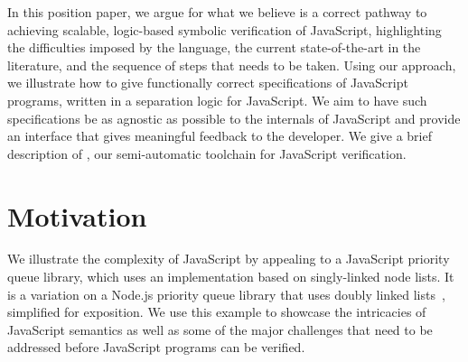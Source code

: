 \documentclass{llncs}
\begin{document}
In this position paper, we argue for what we believe is a correct pathway to achieving scalable, logic-based symbolic verification of JavaScript, highlighting the difficulties imposed by the language, the current state-of-the-art in the literature, and the sequence of steps that needs to be taken. Using our approach, we illustrate how to give functionally correct specifications of JavaScript programs, written in a separation logic for JavaScript. We aim to have such specifications be as agnostic as possible to the internals of JavaScript and provide an interface that gives meaningful feedback to the developer. We give a brief description of \javert, our semi-automatic toolchain for JavaScript verification.


\section{Motivation}
\label{sec:overview}

We illustrate the complexity of JavaScript by appealing to a JavaScript priority queue library, which uses an implementation based on singly-linked node lists. It is a variation on a Node.js priority queue library that uses doubly linked lists~\cite{priq}, simplified for exposition. We use this example to showcase the intricacies of JavaScript semantics as well as some of the major challenges that need to be addressed before JavaScript programs can be verified. 
\end{document}
